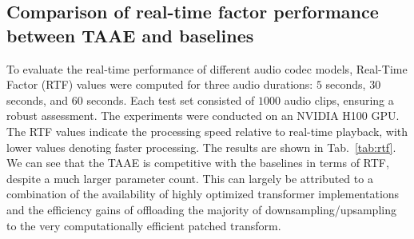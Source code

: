 \documentclass{article} %
\begin{document}
\subsection{Comparison of real-time factor performance between TAAE and baselines}
\label{app:rtf}

To evaluate the real-time performance of different audio codec models, Real-Time Factor (RTF) values were computed for three audio durations: $5$ seconds, $30$ seconds, and $60$ seconds. Each test set consisted of $1000$ audio clips, ensuring a robust assessment. The experiments were conducted on an NVIDIA H100 GPU. The RTF values indicate the processing speed relative to real-time playback, with lower values denoting faster processing. The results are shown in Tab.~\ref{tab:rtf}. We can see that the TAAE is competitive with the baselines in terms of RTF, despite a much larger parameter count. This can largely be attributed to a combination of the availability of highly optimized transformer implementations and the efficiency gains of offloading the majority of downsampling/upsampling to the very computationally efficient patched transform.

\begin{table}[h]
\centering
\scriptsize
\renewcommand{\arraystretch}{1.2} %
\caption{Real-Time Factors (RTFs) for audio codec models on test audio clips of $5$s, $30$s, and $60$s duration using an H100 GPU.}
\label{tab:rtf}
\end{table}
\end{document}
